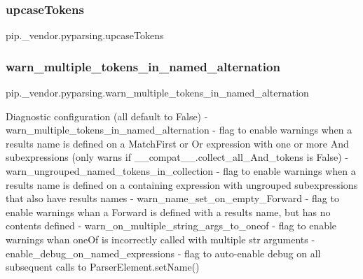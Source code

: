 \subsubsection{\texorpdfstring{upcase\+Tokens}{upcaseTokens}}
{\footnotesize\ttfamily pip.\+\_\+vendor.\+pyparsing.\+upcase\+Tokens}

\mbox{\label{namespacepip_1_1__vendor_1_1pyparsing_ab31ae153ce652f0f0800a5e305b61f79}} 
\subsubsection{\texorpdfstring{warn\+\_\+multiple\+\_\+tokens\+\_\+in\+\_\+named\+\_\+alternation}{warn\_multiple\_tokens\_in\_named\_alternation}}
{\footnotesize\ttfamily pip.\+\_\+vendor.\+pyparsing.\+warn\+\_\+multiple\+\_\+tokens\+\_\+in\+\_\+named\+\_\+alternation}

\begin{DoxyVerb}Diagnostic configuration (all default to False)
 - warn_multiple_tokens_in_named_alternation - flag to enable warnings when a results
   name is defined on a MatchFirst or Or expression with one or more And subexpressions
   (only warns if __compat__.collect_all_And_tokens is False)
 - warn_ungrouped_named_tokens_in_collection - flag to enable warnings when a results
   name is defined on a containing expression with ungrouped subexpressions that also
   have results names
 - warn_name_set_on_empty_Forward - flag to enable warnings whan a Forward is defined
   with a results name, but has no contents defined
 - warn_on_multiple_string_args_to_oneof - flag to enable warnings whan oneOf is
   incorrectly called with multiple str arguments
 - enable_debug_on_named_expressions - flag to auto-enable debug on all subsequent
   calls to ParserElement.setName()
\end{DoxyVerb}
 \mbox{\label{namespacepip_1_1__vendor_1_1pyparsing_a44be796a353f7fca052e4d391862b2f6}} 
